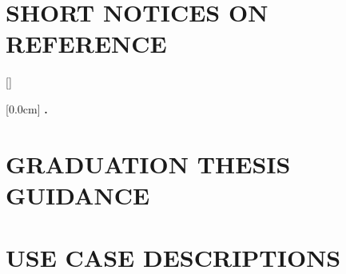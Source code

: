 \documentclass[a4paper,13pt,3p,twoside]{report}
\theoremstyle{definition}
\begin{document}
\newpage
\chapter*{SHORT NOTICES ON REFERENCE} %
\label{chapter:reference}


\newpage
\renewcommand\bibname{REFERENCE}
\printbibliography
{}

\appendixpage
\appendix
\addappheadtotoc

[]
\titlespacing*{\chapter}{0pt}{-20pt}{20pt}

    [0.0cm]             %
    {\bfseries\vspace{0.3cm}}                  %
    {{\bfseries{\scshape} \thecontentslabel.\ }} %
    {}         %
    {\contentspage} 
    
\chapter{GRADUATION THESIS GUIDANCE}


\newpage
\chapter{USE CASE DESCRIPTIONS}

\end{document}
